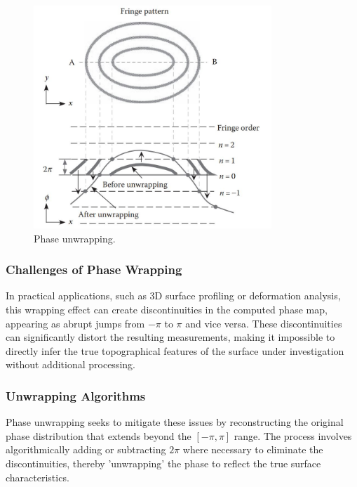 \documentclass[../main.tex]{subfiles}
\begin{document}
\begin{frame}{}
    \begin{figure}[H]
        \centering
        \includegraphics[width=0.8\textwidth]{Images/Introduction/phase_unwrapping}
        \caption{Phase unwrapping.\cite{fringe_analysis}}
        \label{fig:phase_wrapping}
    \end{figure}
\end{frame}

\subsubsection{Challenges of Phase Wrapping}
In practical applications, such as 3D surface profiling or deformation analysis, this wrapping effect can create discontinuities in the computed phase map, appearing as abrupt jumps from $-\pi$ to $\pi$ and vice versa. These discontinuities can significantly distort the resulting measurements, making it impossible to directly infer the true topographical features of the surface under investigation without additional processing.

\subsubsection{Unwrapping Algorithms}
Phase unwrapping seeks to mitigate these issues by reconstructing the original phase distribution that extends beyond the $[-\pi, \pi]$ range. The process involves algorithmically adding or subtracting $2\pi$ where necessary to eliminate the discontinuities, thereby 'unwrapping' the phase to reflect the true surface characteristics.
\end{document}

